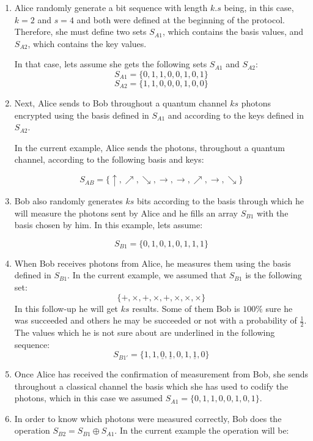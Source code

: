 \begin{enumerate}
  \item Alice randomly generate a bit sequence with length $k.s$ being, in this case, $k=2$ and $s=4$ and both were defined at the beginning of the protocol.
      Therefore, she must define two sets $S_{A1}$, which contains the basis values, and $S_{A2}$, which contains the key values.

      In that case, lets assume she gets the following sets $S_{A1}$ and $S_{A2}$:
      $$S_{A1} = \{0,1,1,0,0,1,0,1 \}$$
      $$S_{A2} = \{1,1,0,0,0,1,0,0 \}$$

  \item Next, Alice sends to Bob throughout a quantum channel $ks$ photons encrypted using the basis defined in $S_{A1}$ and according to the keys defined in $S_{A2}$.

      In the current example, Alice sends the photons, throughout a quantum channel, according to the following basis and keys:

      $$S_{AB} = \{\uparrow, \nearrow, \searrow, \to, \to, \nearrow, \to, \searrow \}$$

  \item Bob also randomly generates $ks$ bits according to the basis through which he will measure the photons sent by Alice and he fills an array $S_{B1}$ with the basis chosen by him. In this example, lets assume:

  $$S_{B1} = \{0,1,0,1,0,1,1,1 \}$$

  \item When Bob receives photons from Alice, he measures them using the basis defined in $S_{B1}$.
  In the current example, we assumed that $S_{B1}$ is the following set:
  $$\{ +,\times,+,\times,+,\times, \times, \times \}$$
  In this follow-up he will get $ks$ results. Some of them Bob is $100\%$ sure he was succeeded and others he may be succeeded or not with a probability of $\frac{1}{2}$. The values which he is not sure about are underlined in the following sequence:
  $$S_{B1\prime} = \{1,1,\underline{0},\underline{1},0,1,\underline{1},0 \}$$

  \item Once Alice has received the confirmation of measurement from Bob, she sends throughout a classical channel the basis which she has used to codify the photons, which in this case we assumed $S_{A1} = \{0,1,1,0,0,1,0,1\}$.

  \item In order to know which photons were measured correctly, Bob does the operation $S_{B2}=S_{B1} \oplus S_{A1}$.
      In the current example the operation will be:


\end{enumerate}
